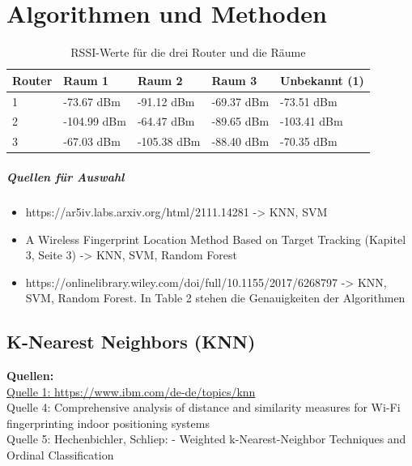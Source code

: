 \chapter{Algorithmen und Methoden}

\begin{table}[h]
    \centering
    \begin{tabularx}{\textwidth}{|X|X|X|X|X|}
        \hline
        Router & Raum 1      & Raum 2      & Raum 3     & Unbekannt (1) \\ \hline
        1      & -73.67 dBm  & -91.12 dBm  & -69.37 dBm & -73.51 dBm    \\ \hline
        2      & -104.99 dBm & -64.47 dBm  & -89.65 dBm & -103.41 dBm   \\ \hline
        3      & -67.03 dBm  & -105.38 dBm & -88.40 dBm & -70.35 dBm    \\ \hline
    \end{tabularx}
    \caption{RSSI-Werte für die drei Router und die Räume}
    \label{tab:rssi_values}
\end{table}

\paragraph{Quellen für Auswahl}

\begin{itemize}
    \item https://ar5iv.labs.arxiv.org/html/2111.14281 -> KNN, SVM
    \item A Wireless Fingerprint Location Method Based on Target Tracking (Kapitel 3, Seite 3) -> KNN, SVM, Random Forest
    \item https://onlinelibrary.wiley.com/doi/full/10.1155/2017/6268797 -> KNN, SVM, Random Forest. In Table 2 stehen die Genauigkeiten der Algorithmen
\end{itemize}

\section{K-Nearest Neighbors (KNN)}
\textbf{Quellen:} \\
\href{https://www.ibm.com/de-de/topics/knn}{Quelle 1: https://www.ibm.com/de-de/topics/knn} \\
Quelle 4: Comprehensive analysis of distance and similarity measures for Wi-Fi fingerprinting indoor positioning systems \\
Quelle 5: Hechenbichler, Schliep: - Weighted k-Nearest-Neighbor Techniques and Ordinal Classification

